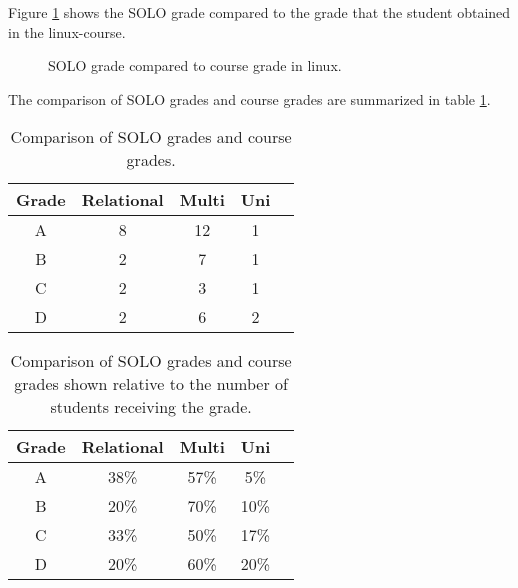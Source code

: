 \documentclass[twoside,twocolumn,a4paper,11pt,english]{article}
\begin{document}
Figure \ref{figlinux} shows the SOLO grade compared to the grade that the student obtained in the linux-course.

\begin{figure}[H]
\caption{SOLO grade compared to course grade in linux.}
\label{figlinux}
\end{figure}

The comparison of SOLO grades and course grades are summarized in table \ref{table:sum}.

\begin{table}[H]
\caption{Comparison of SOLO grades and course grades.}
\centering
\begin{tabular}{c | c c c c}
Grade & Relational & Multi & Uni \\ [0.5ex] %
\hline
A & 8 & 12 & 1 \\
B & 2 & 7 & 1 \\
C & 2 & 3 & 1 \\
D & 2 & 6 & 2 \\ [1ex]
\end{tabular}
\label{table:sum}
\end{table}

\begin{table}[H]
\caption{Comparison of SOLO grades and course grades shown relative to the number of students receiving the grade.}
\centering
\begin{tabular}{c | c c c c}
Grade & Relational & Multi & Uni \\ [0.5ex] %
\hline
A & 38\% & 57\% & 5\% \\
B & 20\% & 70\% & 10\% \\
C & 33\% & 50\% & 17\% \\
D & 20\% & 60\% & 20\% \\ [1ex]
\end{tabular}
\label{table:percentage}
\end{table}
\end{document}

